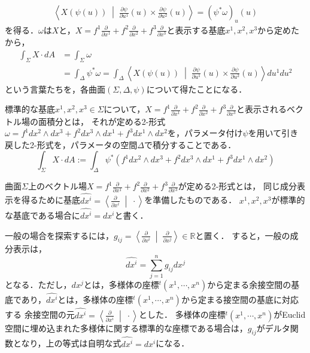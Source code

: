 \documentclass[uplatex, dvipdfmx]{jsreport}
\begin{document}
\begin{align*}
    \left\langle X(\psi(u))\;\middle|\; \frac{\partial \psi}{\partial u^1}(u)\times\frac{\partial \psi}{\partial u^2}(u) \right\rangle
    = (\psi^*\omega)_u(u)
\end{align*}
を得る．$\omega$は$X$と，$X=f^1\frac{\partial}{\partial x^1}+f^2\frac{\partial}{\partial x^2}+f^3\frac{\partial}{\partial x^3}$と表示する基底$x^1,x^2,x^3$から定めたから，
\begin{align*}
    \int_\Sigma X\cdot dA &= \int_\Sigma\omega \\
    &= \int_\Delta \psi^*\omega = \int_\Delta \left\langle X(\psi(u))\;\middle|\; \frac{\partial \psi}{\partial u^1}(u)\times\frac{\partial \psi}{\partial u^2}(u) \right\rangle du^1du^2
\end{align*}
という言葉たちを，各曲面$(\Sigma,\Delta,\psi)$について得たことになる．

\begin{screen}
    標準的な基底$x^1,x^2,x^3\in\Sigma$について，$X=f^1\frac{\partial}{\partial x^1}+f^2\frac{\partial}{\partial x^2}+f^3\frac{\partial}{\partial x^3}$と表示されるベクトル場の面積分とは，
    それが定める2-形式$\omega=f^1 dx^2\wedge dx^3 + f^2dx^3\wedge dx^1 + f^3dx^1\wedge dx^2$を，パラメータ付け$\psi$を用いて引き戻した2-形式を，パラメータの空間$\Delta$で積分することである．
    \[ \int_\Sigma X\cdot dA:=\int_\Delta \psi^*(f^1 dx^2\wedge dx^3 + f^2dx^3\wedge dx^1 + f^3dx^1\wedge dx^2) \]
\end{screen}

\begin{remark}
    曲面$\Sigma$上のベクトル場$X=f^1\frac{\partial}{\partial x^1}+f^2\frac{\partial}{\partial x^2}+f^3\frac{\partial}{\partial x^3}$が定める2-形式とは，
    同じ成分表示を得るために基底$\widehat{dx^i}=\left\langle\frac{\partial}{\partial x^i}\;\middle|\;\cdot\right\rangle$を準備したものである．
    $x^1,x^2,x^3$が標準的な基底である場合に$\widehat{dx^i}=dx^i$と書く．

    一般の場合を探索するには，$g_{ij}=\left\langle\frac{\partial}{\partial x^i}\;\middle|\;\frac{\partial}{\partial x^j}\right\rangle\in\mathbb{R}$と置く．
    すると，一般の成分表示は，
    \[\widehat{dx^i}=\sum^n_{j=1}g_{ij}dx^j\]
    となる．ただし，$dx^j$とは，多様体の座標${}^t(x^1,\cdots,x^n)$から定まる余接空間の基底であり，$\widehat{dx^i}$とは，多様体の座標${}^t(x^1,\cdots,x^n)$から定まる接空間の基底に対応する
    余接空間の元$\widehat{dx^i}=\left\langle\frac{\partial}{\partial x^i}\;\middle|\;\cdot\right\rangle$とした．
    多様体の座標${}^t(x^1,\cdots,x^n)$がEuclid空間に埋め込まれた多様体に関する標準的な座標である場合は，$g_{ij}$がデルタ関数となり，上の等式は自明な式$\widehat{dx^i}=dx^i$になる．
\end{remark}
\end{document}
